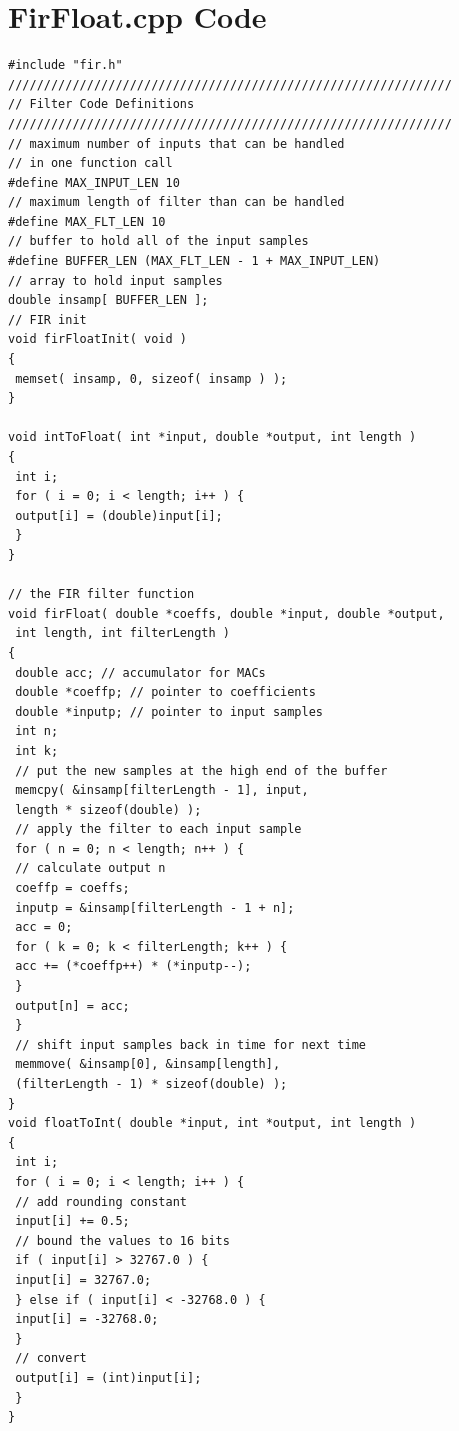 \documentclass{article}
\begin{document}
\section{FirFloat.cpp Code}
\begin{lstlisting}
#include "fir.h"
//////////////////////////////////////////////////////////////
// Filter Code Definitions
//////////////////////////////////////////////////////////////
// maximum number of inputs that can be handled
// in one function call
#define MAX_INPUT_LEN 10
// maximum length of filter than can be handled
#define MAX_FLT_LEN 10
// buffer to hold all of the input samples
#define BUFFER_LEN (MAX_FLT_LEN - 1 + MAX_INPUT_LEN)
// array to hold input samples
double insamp[ BUFFER_LEN ];
// FIR init
void firFloatInit( void )
{
 memset( insamp, 0, sizeof( insamp ) );
}

void intToFloat( int *input, double *output, int length )
{
 int i;
 for ( i = 0; i < length; i++ ) {
 output[i] = (double)input[i];
 }
}

// the FIR filter function
void firFloat( double *coeffs, double *input, double *output,
 int length, int filterLength )
{
 double acc; // accumulator for MACs
 double *coeffp; // pointer to coefficients
 double *inputp; // pointer to input samples
 int n;
 int k;
 // put the new samples at the high end of the buffer
 memcpy( &insamp[filterLength - 1], input,
 length * sizeof(double) );
 // apply the filter to each input sample
 for ( n = 0; n < length; n++ ) {
 // calculate output n
 coeffp = coeffs;
 inputp = &insamp[filterLength - 1 + n];
 acc = 0;
 for ( k = 0; k < filterLength; k++ ) {
 acc += (*coeffp++) * (*inputp--);
 }
 output[n] = acc;
 }
 // shift input samples back in time for next time
 memmove( &insamp[0], &insamp[length],
 (filterLength - 1) * sizeof(double) );
}
void floatToInt( double *input, int *output, int length )
{
 int i;
 for ( i = 0; i < length; i++ ) {
 // add rounding constant
 input[i] += 0.5;
 // bound the values to 16 bits
 if ( input[i] > 32767.0 ) {
 input[i] = 32767.0;
 } else if ( input[i] < -32768.0 ) {
 input[i] = -32768.0;
 }
 // convert
 output[i] = (int)input[i];
 }
}

\end{lstlisting}
\vspace{3cm}
\end{document}
